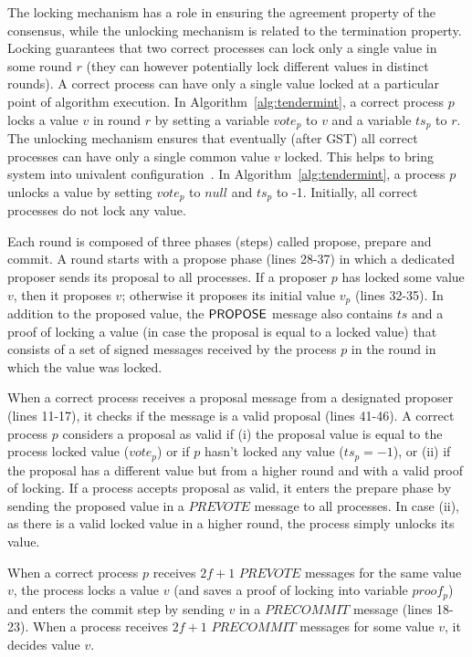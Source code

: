 The locking mechanism has a role in ensuring the agreement property of the consensus, while the unlocking mechanism is related to the termination property. Locking guarantees that two correct processes can lock only a single value in some round $r$ (they can however potentially lock different values in distinct rounds). A correct process can have only a single value locked at a particular point of algorithm execution. In Algorithm~\ref{alg:tendermint}, a correct process $p$ locks a value $v$ in round $r$ by setting a variable $vote_p$ to $v$ and a variable $ts_p$ to $r$. The unlocking mechanism ensures that eventually (after GST) all correct processes can have only a single common value $v$ locked. This helps to bring system into univalent configuration~\cite{FLP85:jacm}. In Algorithm~\ref{alg:tendermint}, a process $p$ unlocks a value by setting $vote_p$ to $null$ and $ts_p$ to -1. Initially, all correct processes do not lock any value.

Each round is composed of three phases (steps) called propose, prepare and commit. A round starts with a propose phase (lines 28-37) in which a dedicated proposer sends its proposal to all processes. If a proposer $p$ has locked some value $v$, then it proposes $v$; otherwise it proposes its initial value $v_p$ (lines 32-35). In addition to the proposed value, the $\mathsf{PROPOSE}$ message also contains $ts$ and a proof of locking a value (in case the proposal is equal to a locked value) that consists of a set of signed messages received by the process $p$ in the round in which the value was locked. 

When a correct process receives a proposal message from a designated proposer (lines 11-17), it checks if the message is a valid proposal (lines 41-46). A correct process $p$ considers a proposal as valid if (i) the proposal value is equal to the process locked value ($vote_p$) or if $p$ hasn't locked any value ($ts_p = -1$), or (ii) if the proposal has a different value but from a higher round and with a valid proof of locking. If a process accepts proposal as valid, it enters the prepare phase by sending the proposed value in a $PREVOTE$ message to all processes. In case (ii), as there is a valid locked value in a higher round, the process simply unlocks its value.  

When a correct process $p$ receives $2f+1$ $PREVOTE$ messages for the same value $v$, the process locks a value $v$ (and saves a proof of locking into variable $proof_p$) and enters the commit step by sending $v$ in a $PRECOMMIT$ message (lines 18-23). When a process receives $2f+1$ $PRECOMMIT$ messages for some value $v$, it decides value $v$. 

